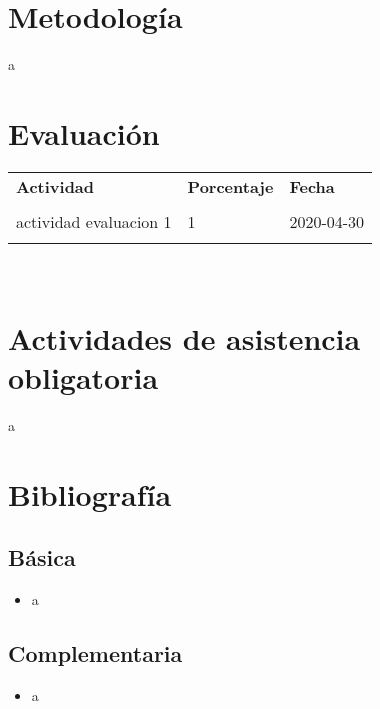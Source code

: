 \documentclass[11pt]{article}
\begin{document}
\section*{Metodología}

a

\section*{Evaluación}
\noindent \begin{tabular}{R{0.5\textwidth} C{0.2\textwidth} C{0.2\textwidth}}
	\toprule
	\textbf{Actividad} & \textbf{Porcentaje} & \textbf{Fecha} \\
	\\
	\midrule
	actividad evaluacion 1 & 1 & 2020-04-30 \\ 
	\\
	\midrule
\end{tabular}
\\
\section*{Actividades de asistencia obligatoria}

a

\section*{Bibliografía}

\subsection*{Básica}

\begin{itemize}
\item a 
\end{itemize}

\subsection*{Complementaria}

\begin{itemize}
\item a 
\end{itemize}
\end{document}
